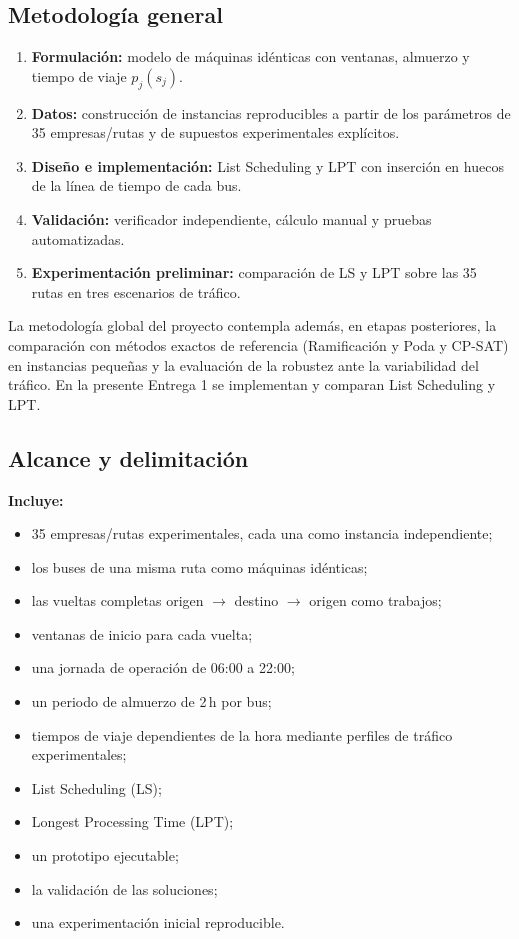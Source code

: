 \subsection{Metodología general}
\begin{enumerate}
  \item \textbf{Formulación:} modelo de máquinas idénticas con ventanas, almuerzo y tiempo de viaje $p_j(s_j)$.
  \item \textbf{Datos:} construcción de instancias reproducibles a partir de los parámetros de 35 empresas/rutas y de supuestos experimentales explícitos.
  \item \textbf{Diseño e implementación:} List Scheduling y LPT con inserción en huecos de la línea de tiempo de cada bus.
  \item \textbf{Validación:} verificador independiente, cálculo manual y pruebas automatizadas.
  \item \textbf{Experimentación preliminar:} comparación de LS y LPT sobre las 35 rutas en tres escenarios de tráfico.
\end{enumerate}
La metodología global del proyecto contempla además, en etapas posteriores, la comparación con métodos exactos de referencia (Ramificación y Poda y CP-SAT) en instancias pequeñas y la evaluación de la robustez ante la variabilidad del tráfico. En la presente Entrega 1 se implementan y comparan List Scheduling y LPT.

\subsection{Alcance y delimitación}
\textbf{Incluye:}
\begin{itemize}
  \item 35 empresas/rutas experimentales, cada una como instancia independiente;
  \item los buses de una misma ruta como máquinas idénticas;
  \item las vueltas completas origen $\to$ destino $\to$ origen como trabajos;
  \item ventanas de inicio para cada vuelta;
  \item una jornada de operación de 06:00 a 22:00;
  \item un periodo de almuerzo de 2\,h por bus;
  \item tiempos de viaje dependientes de la hora mediante perfiles de tráfico experimentales;
  \item List Scheduling (LS);
  \item Longest Processing Time (LPT);
  \item un prototipo ejecutable;
  \item la validación de las soluciones;
  \item una experimentación inicial reproducible.
\end{itemize}

